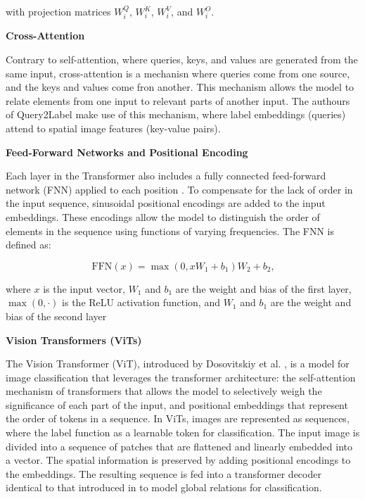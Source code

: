 \documentclass[lettersize,journal]{IEEEtran}
\renewcommand{\paragraph}[1]{%
  \vspace{1.5ex}\textbf{#1}\quad
}
\begin{document}
\noindent with projection matrices $W_i^Q$, $W_i^K$, $W_i^V$, and $W_i^O$.

\paragraph{Cross-Attention}
Contrary to self-attention, where queries, keys, and values are generated from the same input, cross-attention is a mechanisn where queries come from one source, and the keys and values come fron another. This mechanism allows the model to relate elements from one input to relevant parts of another input. The authours of Query2Label \cite{Query2Label} make use of this mechanism, where label embeddings (queries) attend to spatial image features (key-value pairs).



\paragraph{Feed-Forward Networks and Positional Encoding}
Each layer in the Transformer also includes a fully connected feed-forward network (FNN) applied to each position \cite{vaswani2023attentionneed}. To compensate for the lack of order in the input sequence, sinusoidal positional encodings are added to the input embeddings. These encodings allow the model to distinguish the order of elements in the sequence using functions of varying frequencies. The FNN is defined as:

\begin{equation}
    \label{eq:ffn}
    \text{FFN}(x) = \max(0, xW_1 + b_1)W_2 + b_2\text{,}
\end{equation}

where $x$ is the input vector, $W_1$ and $b_1$ are the weight and bias of the first layer, $\max(0,\cdot)$ is the ReLU activation function, and $W_1$ and $b_1$ are the weight and bias of the second layer

\paragraph{Vision Transformers (ViTs)}
The Vision Transformer (ViT), introduced by Dosovitskiy et al. \cite{dosovitskiy2021imageworth16x16words}, is a model for image classification that leverages the transformer architecture: the self-attention mechanism of transformers that allows the model to selectively weigh the significance of each part of the input, and positional embeddings that represent the order of tokens in a sequence. In ViTs, images are represented as sequences, where the label function as a learnable token for classification. The input image is divided into a sequence of patches that are flattened and linearly embedded into a vector. The spatial information is preserved by adding positional encodings to the embeddings. The resulting sequence is fed into a transformer decoder identical to that introduced in \cite{vaswani2023attentionneed} to model global relations for classification.
\end{document}
